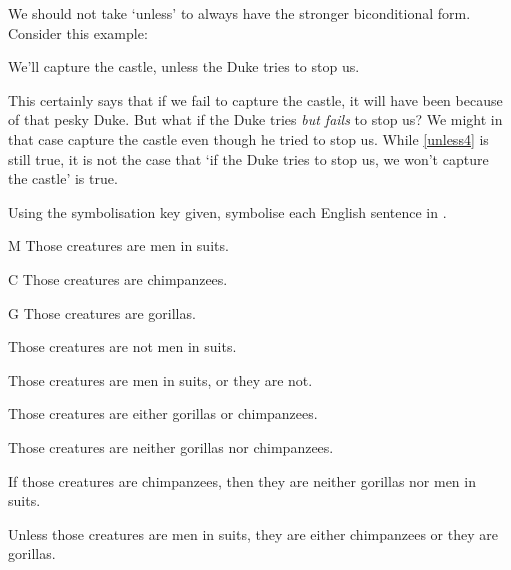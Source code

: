 We should not take `unless' to always have the stronger biconditional form. Consider this example: 
\begin{earg}
\item[\ex{unless4}] We'll capture the castle, unless the Duke tries to stop us.
\end{earg} This certainly says that if we fail to capture the castle, it will have been because of that pesky Duke. But what if the Duke tries \emph{but fails} to stop us? We might in that case capture the castle even though he tried to stop us. While \ref{unless4} is still true, it is not the case that `if the Duke tries to stop us, we won't capture the castle' is true.



\practiceproblems
\solutions
\problempart Using the symbolisation key given, symbolise each English sentence in \TFL.\label{pr.monkeysuits}
	\begin{ekey}
		\item[M] Those creatures are men in suits. 
		\item[C] Those creatures are chimpanzees. 
		\item[G] Those creatures are gorillas.
	\end{ekey}
\begin{earg}
\item Those creatures are not men in suits.
\item Those creatures are men in suits, or they are not.
\item Those creatures are either gorillas or chimpanzees.
\item Those creatures are neither gorillas nor chimpanzees.
\item If those creatures are chimpanzees, then they are neither gorillas nor men in suits.
\item Unless those creatures are men in suits, they are either chimpanzees or they are gorillas.
\end{earg}

